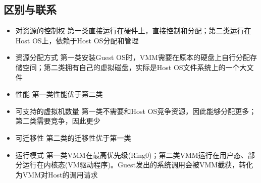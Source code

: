\subsection{区别与联系}

\begin{itemize}
    \item 对资源的控制权
    \subitem 第一类直接运行在硬件上，直接控制和分配；第二类运行在Host OS上，依赖于Host OS分配和管理
    \item 资源分配方式
    \subitem 第一类安装Guest OS时，VMM需要在原本的硬盘上自行分配存储空间；第二类拥有自己的虚拟磁盘，实际是Host OS文件系统上的一个大文件
    \item 性能
    \subitem 第一类性能优于第二类
    \item  可支持的虚拟机数量
    \subitem 第一类不需要和Host OS竞争资源，因此能够分配更多；第二类需要竞争，因此更少
    \item 可迁移性
    \subitem 第二类的迁移性优于第一类
    \item 运行模式
    \subitem 第一类VMM在最高优先级(Ring0)；第二类VMM运行在用户态、部分运行在内核态(VM驱动程序)。Guest发出的系统调用会被VMM截获，转化为VMM对Host的调用请求
\end{itemize}

